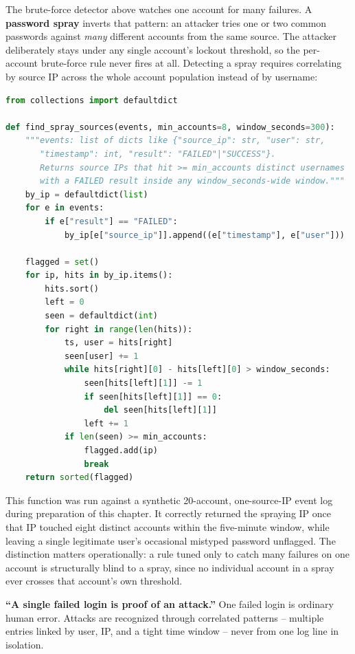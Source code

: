 \begin{example}
The brute-force detector above watches one account for many failures. A \textbf{password spray}
inverts that pattern: an attacker tries one or two common passwords against \emph{many} different
accounts from the same source. The attacker deliberately stays under any single account's lockout
threshold, so the per-account brute-force rule never fires at all. Detecting a spray requires correlating by
source IP across the whole account population instead of by username:
\begin{lstlisting}[language=Python, caption={Detecting a password-spray pattern by source IP fan-out}]
from collections import defaultdict

def find_spray_sources(events, min_accounts=8, window_seconds=300):
    """events: list of dicts like {"source_ip": str, "user": str,
       "timestamp": int, "result": "FAILED"|"SUCCESS"}.
       Returns source IPs that hit >= min_accounts distinct usernames
       with a FAILED result inside any window_seconds-wide window."""
    by_ip = defaultdict(list)
    for e in events:
        if e["result"] == "FAILED":
            by_ip[e["source_ip"]].append((e["timestamp"], e["user"]))

    flagged = set()
    for ip, hits in by_ip.items():
        hits.sort()
        left = 0
        seen = defaultdict(int)
        for right in range(len(hits)):
            ts, user = hits[right]
            seen[user] += 1
            while hits[right][0] - hits[left][0] > window_seconds:
                seen[hits[left][1]] -= 1
                if seen[hits[left][1]] == 0:
                    del seen[hits[left][1]]
                left += 1
            if len(seen) >= min_accounts:
                flagged.add(ip)
                break
    return sorted(flagged)
\end{lstlisting}
This function was run against a synthetic 20-account, one-source-IP event log during preparation of
this chapter. It correctly returned the spraying IP once that IP touched eight distinct accounts
within the five-minute window, while leaving a single legitimate user's occasional mistyped password
unflagged. The distinction matters operationally: a rule tuned only to catch many failures on one
account is structurally blind to a spray, since no individual account in a spray ever crosses that
account's own threshold.
\end{example}

\begin{misconception}
\textbf{``A single failed login is proof of an attack.''} One failed login is ordinary human
error. Attacks are recognized through correlated patterns -- multiple entries linked by user, IP,
and a tight time window -- never from one log line in isolation.
\end{misconception}

